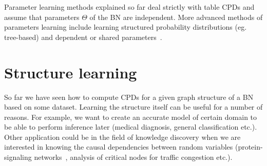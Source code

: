 \documentclass[english,cover]{fitthesis} %
\begin{document}
\medskip

Parameter learning methods explained so far deal strictly with table CPDs and assume that parameters $\Theta$ of the BN are independent. More advanced methods of parameters learning include learning structured probability distributions (eg. tree-based) and dependent or shared parameters~\cite{pgm}.

\section{Structure learning}
So far we have seen how to compute CPDs for a given graph structure of a BN based on some dataset. Learning the structure itself can be useful for a number of reasons. For example, we want to create an accurate model of certain domain to be able to perform inference later (medical diagnosis, general classification etc.). Other application could be in the field of knowledge discovery when we are interested in knowing the causal dependencies between random variables (protein-signaling networks~\cite{sachs05}, analysis of critical nodes for traffic congestion etc.).
\end{document}
